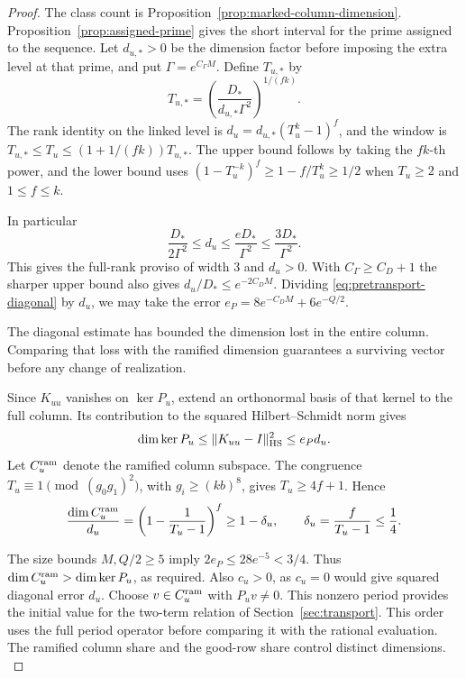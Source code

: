 \begin{proof}
The class count is Proposition~\ref{prop:marked-column-dimension}.
Proposition~\ref{prop:assigned-prime} gives the short interval
for the prime assigned to the sequence. Let \(d_{u,*}>0\)
be the dimension factor before imposing the extra level at
that prime, and put \(\Gamma=e^{C_\Gamma M}\).
Define \(T_{u,*}\) by
\[
 T_{u,*}=\left(\frac{D_*}{d_{u,*}\Gamma^2}\right)^{1/(fk)} .
\]
The rank identity on the linked level is
\(d_u=d_{u,*}(T_u^k-1)^f\), and the window is
\(T_{u,*}\le T_u\le (1+1/(fk))T_{u,*}\).
The upper bound follows by taking the \(fk\)-th power, and the lower
bound uses \((1-T_u^{-k})^f\ge1-f/T_u^k\ge 1/2\)
when \(T_u\ge2\) and \(1\le f\le k\).

In particular
\begin{equation}\label{eq:linked-rank-window}
 \frac{D_*}{2\Gamma^2}\le d_u\le
       \frac{eD_*}{\Gamma^2}\le \frac{3D_*}{\Gamma^2}.
\end{equation}
This gives the full-rank proviso of width \(3\) and \(d_u>0\).
With \(C_\Gamma\ge C_D+1\) the sharper upper bound also gives
\(d_u/D_*\le e^{-2C_D M}\). Dividing
\eqref{eq:pretransport-diagonal} by \(d_u\), we may take the error
\(e_P=8e^{-C_D M}+6e^{-Q/2}\).


The diagonal estimate has bounded the dimension lost in the entire column. Comparing that loss with the ramified dimension guarantees a surviving vector before any change of realization.


Since \(K_{uu}\) vanishes on \(\ker P_u\), extend an orthonormal
basis of that kernel to the full column. Its contribution to the
squared Hilbert--Schmidt norm gives
\[
 \dim\ker P_u\le \|K_{uu}-I\|_{\rm HS}^2\le e_Pd_u .
\]
Let \(C_u^{\rm ram}\) denote the ramified column subspace. The congruence
\(T_u\equiv1\pmod{(g_0g_1)^2}\), with \(g_i\ge(kb)^8\), gives
\(T_u\ge4f+1\). Hence
\[
 \frac{\dim C_u^{\rm ram}}{d_u}
 =\left(1-\frac{1}{T_u-1}\right)^f
 \ge 1-\delta_u,\qquad \delta_u=\frac f{T_u-1}\le\frac14 .
\]

The size bounds \(M,Q/2\ge5\) imply \(2e_P\le28e^{-5}<3/4\).
Thus \(\dim C_u^{\rm ram}>\dim\ker P_u\), as required.
Also \(c_u>0\), as \(c_u=0\) would give squared diagonal error
\(d_u\). Choose \(v\in C_u^{\rm ram}\) with \(P_uv\ne0\). This nonzero
period provides the initial value for the two-term relation of
Section~\ref{sec:transport}.
This order uses the full period operator before comparing it with
the rational evaluation. The ramified column share and the good-row
share control distinct dimensions. \label{cor:selected-row-gram-4}

\end{proof}

